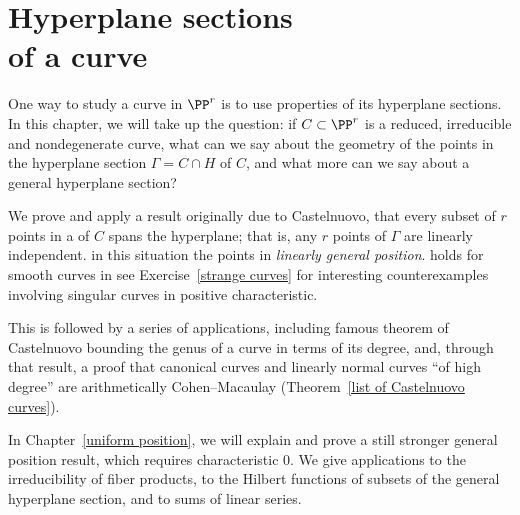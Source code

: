 


\chapter[Hyperplane sections of a curve]{Hyperplane sections\\of a curve}
\label{linear general position chapter}

One way to study a curve in $\PP^r$ is to use properties of its hyperplane
sections. In this chapter, we will take up the question: if $C \subset
\PP^r$ is a reduced, irreducible and nondegenerate curve, what can we say
about the geometry of the points in the  hyperplane section 
$\Gamma = C \cap H$ of $C$, and what more can we say about a general hyperplane
section?

We prove and apply a result originally due to Castelnuovo,
%
that every subset of $r$ points in a
%
of $C$ spans the hyperplane; that is, any $r$
points of $\Gamma$ are linearly independent. 
in this situation 
the points 
in \emph{linearly general position}.
%
holds for smooth curves in 
%
see
Exercise~\ref{strange curves} for
interesting counterexamples involving singular curves in positive
characteristic. 

This is followed by a series of applications,
including 
%
famous theorem of Castelnuovo bounding the genus of a
curve in terms of its degree,
and, through that result, a proof that canonical curves and linearly
normal curves ``of high degree'' are arithmetically Cohen--Macaulay
%
(Theorem~\ref{list of Castelnuovo curves}).

{\footnotesize  %
In Chapter~\ref{uniform position}, we will explain and prove a still
stronger general position result, which requires characteristic 0. We
give applications to the irreducibility of fiber products, to the Hilbert
functions of subsets of the
general hyperplane section, and to sums of linear series.

}

